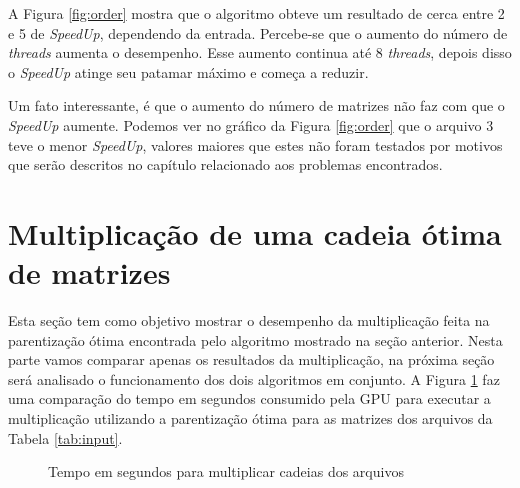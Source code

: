 \documentclass[12pt,openright,oneside,chapter=TITLE,section=TITLE,
    brazil]{utfpr-pg}
\begin{document}
A Figura \ref{fig:order} mostra que o algoritmo obteve um resultado de cerca entre 2 e 5 de \emph{SpeedUp}, dependendo da entrada. Percebe-se que o aumento do número de \emph{threads} aumenta o desempenho. Esse aumento continua até 8 \emph{threads}, depois disso o \emph{SpeedUp} atinge seu patamar máximo e começa a reduzir.

Um fato interessante, é que o aumento do número de matrizes não faz com que o \emph{SpeedUp} aumente. Podemos ver no gráfico da Figura \ref{fig:order} que o arquivo 3 teve o menor \emph{SpeedUp}, valores maiores que estes não foram testados por motivos que serão descritos no capítulo relacionado aos problemas encontrados. 

\section{Multiplicação de uma cadeia ótima de matrizes}
\vspace{-0.7cm}

Esta seção tem como objetivo mostrar o desempenho da multiplicação feita na parentização ótima encontrada pelo algoritmo mostrado na seção anterior. Nesta parte vamos comparar apenas os resultados da multiplicação, na próxima seção será analisado o funcionamento dos dois algoritmos em conjunto. A Figura \ref{fig:matrix} faz uma comparação do tempo  em segundos consumido pela GPU para executar a multiplicação utilizando a parentização ótima para as matrizes dos arquivos da Tabela \ref{tab:input}.

\begin{figure}[h]
	\centering	
	{%
		\setlength{\fboxsep}{0pt}%
		\setlength{\fboxrule}{1pt}%
	}%
	\vspace{-0.3cm}
	\caption{Tempo em segundos para multiplicar cadeias dos arquivos} \label{fig:matrix}
\end{figure}
\end{document}
